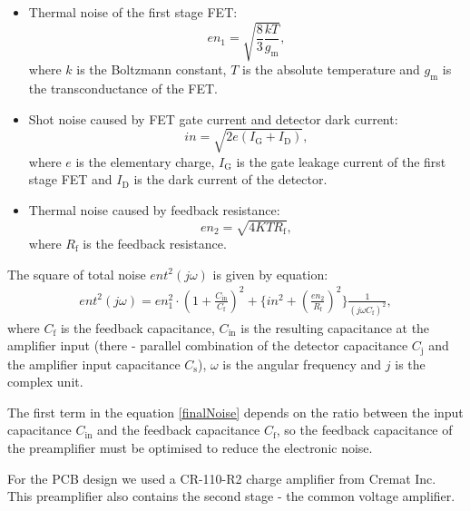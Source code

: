 \begin{itemize}
\item Thermal noise of the first stage FET:
\begin{equation}
en_1 = \sqrt{\frac{8}{3}\frac{kT}{g_{\textrm{m}}}},
\end{equation}
where $k$ is the Boltzmann constant, $T$ is the absolute temperature and $g_{\textrm{m}}$ is the transconductance of the FET.
\item Shot noise caused by FET gate current and detector dark current:
\begin{equation}
in = \sqrt{2e(I_{\textrm{G}} + I_{\textrm{D}})},
\end{equation}
where $e$ is the elementary charge, $I_{\textrm{G}}$ is the gate leakage current of the first stage FET and $I_{\textrm{D}}$ is the dark current of the detector.
\item Thermal noise caused by feedback resistance: 
\begin{equation}
en_2 = \sqrt{4KTR_{\textrm{f}}},
\end{equation}
where $R_{\textrm{f}}$ is the feedback resistance.
\end{itemize}
The square of total noise $ent^2(j \omega)$ is given by equation:
\begin{equation}
\begin{aligned}
ent^2(j \omega) = en_1^2 \cdot (1+\frac{C_{\textrm{in}}}{C_{\textrm{f}}})^2 + \{in^2 + (\frac{en_2}{R_{\textrm{f}}})^2 \}\frac{1}{(j \omega C_{\textrm{f}})^2},
\end{aligned}
\label{finalNoise}
\end{equation}
where $C_{\textrm{f}}$ is the feedback capacitance, $C_{\textrm{in}}$ is the resulting capacitance at the amplifier input (there - parallel combination of the detector capacitance $C_{\textrm{j}}$ and the amplifier input capacitance $C_{\textrm{s}}$), $\omega$ is the angular frequency and $j$ is the complex unit.
\par
The first term in the equation \ref{finalNoise} depends on the ratio between the input capacitance $C_{\textrm{in}}$ and the feedback capacitance $C_{\textrm{f}}$, so the feedback capacitance of the preamplifier must be optimised to reduce the electronic noise.
\par
For the PCB design we used a CR-110-R2 charge amplifier from Cremat Inc. This preamplifier also contains the second stage - the common voltage amplifier.
